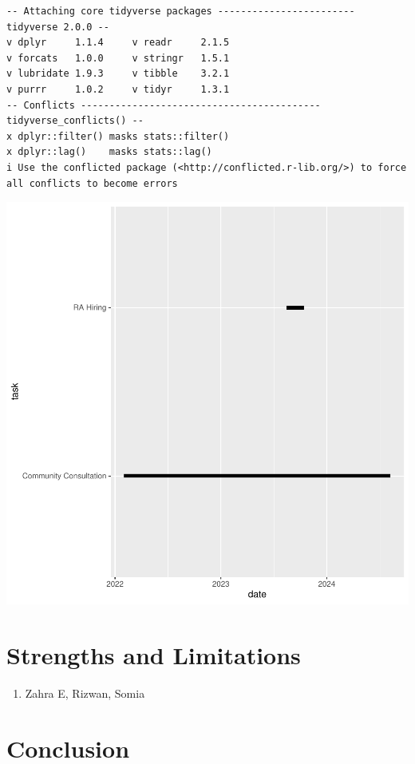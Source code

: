 \documentclass[
  man,
  longtable,
  nolmodern,
  notxfonts,
  notimes,
  colorlinks=true,linkcolor=blue,citecolor=blue,urlcolor=blue]{apa7}
\providecommand{\tightlist}{%
  \setlength{\itemsep}{0pt}\setlength{\parskip}{0pt}}
\begin{document}
\begin{verbatim}
-- Attaching core tidyverse packages ------------------------ tidyverse 2.0.0 --
v dplyr     1.1.4     v readr     2.1.5
v forcats   1.0.0     v stringr   1.5.1
v lubridate 1.9.3     v tibble    3.2.1
v purrr     1.0.2     v tidyr     1.3.1
-- Conflicts ------------------------------------------ tidyverse_conflicts() --
x dplyr::filter() masks stats::filter()
x dplyr::lag()    masks stats::lag()
i Use the conflicted package (<http://conflicted.r-lib.org/>) to force all conflicts to become errors
\end{verbatim}

\includegraphics{protocol_APA_files/figure-pdf/unnamed-chunk-9-1.pdf}

\section{Strengths and Limitations}\label{strengths-and-limitations}

\begin{enumerate}
\def\labelenumi{\arabic{enumi}.}
\tightlist
\item
  Zahra E, Rizwan, Somia
\end{enumerate}

\section{Conclusion}\label{conclusion}
\end{document}
